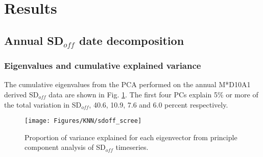\documentclass{tATO2e}
\newcommand{\sdoff}{SD$_{off}$}
\begin{document}
\section{Results}
\subsection{Annual \sdoff{} date decomposition}
\subsubsection{Eigenvalues and cumulative explained variance}
The cumulative eigenvalues from the PCA performed on the annual M*D10A1 derived \sdoff{} data are shown in Fig. \ref{sdoffscree}. The first four PCs explain 5\% or more of the total variation in \sdoff{}, 40.6, 10.9, 7.6 and 6.0 percent respectively.
\begin{figure}
	\begin{center}
	\texttt{[image: Figures/KNN/sdoff\_scree]}
	\caption{Proportion of variance explained for each eigenvector from principle component analysis of \sdoff{} timeseries.}
	\label{sdoffscree}
	\end{center}
\end{figure}
 
\end{document}
